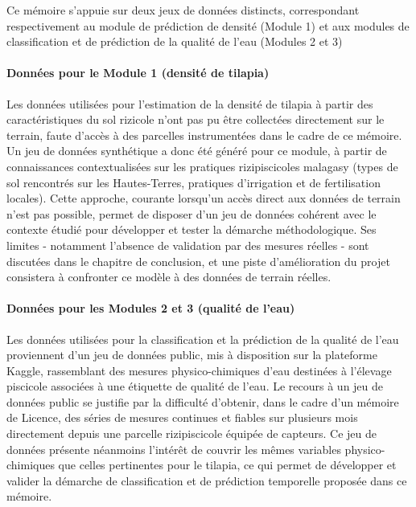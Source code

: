 \documentclass[a4paper,12pt, oneside]{article}
\begin{document}
Ce mémoire s'appuie sur deux jeux de données distincts, correspondant respectivement au module de prédiction de densité (Module 1) et aux modules de classification et de prédiction de la qualité de l'eau (Modules 2 et 3)

\paragraph{Données pour le Module 1 (densité de tilapia)\\}

Les données utilisées pour l'estimation de la densité de tilapia à partir des caractéristiques du sol rizicole n'ont pas pu être collectées directement sur le terrain, faute d'accès à des parcelles instrumentées dans le cadre de ce mémoire. Un jeu de données synthétique a donc été généré pour ce module, à partir de connaissances contextualisées sur les pratiques rizipiscicoles malagasy (types de sol rencontrés sur les Hautes-Terres, pratiques d'irrigation et de fertilisation locales). Cette approche, courante lorsqu'un accès direct aux données de terrain n'est pas possible, permet de disposer d'un jeu de données cohérent avec le contexte étudié pour développer et tester la démarche méthodologique. Ses limites - notamment l'absence de validation par des mesures réelles - sont discutées dans le chapitre de conclusion, et une piste d'amélioration du projet consistera à confronter ce modèle à des données de terrain réelles.

\paragraph{Données pour les Modules 2 et 3 (qualité de l'eau)\\}

Les données utilisées pour la classification et la prédiction de la qualité de l'eau proviennent d'un jeu de données public, mis à disposition sur la plateforme Kaggle\cite{kagglefishlife}, rassemblant des mesures physico-chimiques d'eau destinées à l'élevage piscicole associées à une étiquette de qualité de l'eau. Le recours à un jeu de données public se justifie par la difficulté d'obtenir, dans le cadre d'un mémoire de Licence, des séries de mesures continues et fiables sur plusieurs mois directement depuis une parcelle rizipiscicole équipée de capteurs. Ce jeu de données présente néanmoins l'intérêt de couvrir les mêmes variables physico-chimiques que celles pertinentes pour le tilapia, ce qui permet de développer et valider la démarche de classification et de prédiction temporelle proposée dans ce mémoire.
\end{document}
